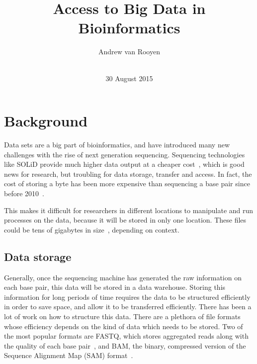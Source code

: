 \documentclass{sig-alternate-05-2015}
\begin{document}


\title{Access to Big Data in Bioinformatics}

\author{
\alignauthor
Andrew van Rooyen\\
       \\
}

\date{30 August 2015}

\maketitle
\begin{abstract}
\end{abstract}


\section{Background}

Data sets are a big part of bioinformatics, and have introduced many new challenges with the rise of next generation sequencing. Sequencing technologies like SOLiD provide much higher data output at a cheaper cost~\cite{shendure2008next}, which is good news for research, but troubling for data storage, transfer and access. In fact, the cost of storing a byte has been more expensive than sequencing a base pair since before 2010~\cite{baker2010next}.

This makes it difficult for researchers in different locations to manipulate and run processes on the data, because it will be stored in only one location. These files could be tens of gigabytes in size~\cite{deorowicz2011compression}, depending on context.

\subsection{Data storage}
Generally, once the sequencing machine has generated the raw information on each base pair, this data will be stored in a data warehouse. Storing this information for long periods of time requires the data to be structured efficiently in order to save space, and allow it to be transferred efficiently.
There has been a lot of work on how to structure this data. There are a plethora of file formats whose efficiency depends on the kind of data which needs to be stored. Two of the most popular formats are FASTQ, which stores aggregated reads along with the quality of each base pair~\cite{cock2010sanger}, and BAM, the binary, compressed version of the Sequence Alignment Map (SAM) format~\cite{SAMspec}.
\end{document}
